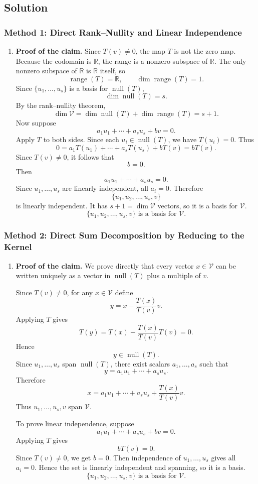\documentclass[12pt]{article}
\newcommand{\R}{\mathbb{R}}
\newcommand{\V}{\mathcal{V}}
\newcommand{\Null}{\operatorname{null}}
\newcommand{\Range}{\operatorname{range}}
\begin{document}
\newpage
\subsection{Solution}

\subsubsection{Method 1: Direct Rank--Nullity and Linear Independence}
\begin{enumerate}[label=(\alph*)]
  \item \textbf{Proof of the claim.}
  Since $T(v)\ne0$, the map $T$ is not the zero map. Because the codomain is $\R$, the range is a nonzero subspace of $\R$. The only nonzero subspace of $\R$ is $\R$ itself, so
  \[
  \Range(T)=\R,
  \qquad
  \dim\Range(T)=1.
  \]
  Since $\{u_1,\ldots,u_s\}$ is a basis for $\Null(T)$,
  \[
  \dim\Null(T)=s.
  \]
  By the rank--nullity theorem,
  \[
  \dim\V=\dim\Null(T)+\dim\Range(T)=s+1.
  \]
  Now suppose
  \[
  a_1u_1+\cdots+a_su_s+bv=0.
  \]
  Apply $T$ to both sides. Since each $u_i\in\Null(T)$, we have $T(u_i)=0$. Thus
  \[
  0=a_1T(u_1)+\cdots+a_sT(u_s)+bT(v)=bT(v).
  \]
  Since $T(v)\ne0$, it follows that
  \[
  b=0.
  \]
  Then
  \[
  a_1u_1+\cdots+a_su_s=0.
  \]
  Since $u_1,
  \ldots,u_s$ are linearly independent, all $a_i=0$. Therefore
  \[
  \{u_1,u_2,\ldots,u_s,v\}
  \]
  is linearly independent. It has $s+1=\dim\V$ vectors, so it is a basis for $\V$.
  \[
  \boxed{\{u_1,u_2,\ldots,u_s,v\}\text{ is a basis for }\V.}
  \]
\end{enumerate}

\newpage
\subsubsection{Method 2: Direct Sum Decomposition by Reducing to the Kernel}
\begin{enumerate}[label=(\alph*)]
  \item \textbf{Proof of the claim.}
  We prove directly that every vector $x\in\V$ can be written uniquely as a vector in $\Null(T)$ plus a multiple of $v$.

  Since $T(v)\ne0$, for any $x\in\V$ define
  \[
  y=x-\frac{T(x)}{T(v)}v.
  \]
  Applying $T$ gives
  \[
  T(y)=T(x)-\frac{T(x)}{T(v)}T(v)=0.
  \]
  Hence
  \[
  y\in\Null(T).
  \]
  Since $u_1,
  \ldots,u_s$ span $\Null(T)$, there exist scalars $a_1,
  \ldots,a_s$ such that
  \[
  y=a_1u_1+\cdots+a_su_s.
  \]
  Therefore
  \[
  x=a_1u_1+\cdots+a_su_s+\frac{T(x)}{T(v)}v.
  \]
  Thus $u_1,
  \ldots,u_s,v$ span $\V$.

  To prove linear independence, suppose
  \[
  a_1u_1+\cdots+a_su_s+bv=0.
  \]
  Applying $T$ gives
  \[
  bT(v)=0.
  \]
  Since $T(v)\ne0$, we get $b=0$. Then independence of $u_1,
  \ldots,u_s$ gives all $a_i=0$. Hence the set is linearly independent and spanning, so it is a basis.
  \[
  \boxed{\{u_1,u_2,\ldots,u_s,v\}\text{ is a basis for }\V.}
  \]
\end{enumerate}
\end{document}
